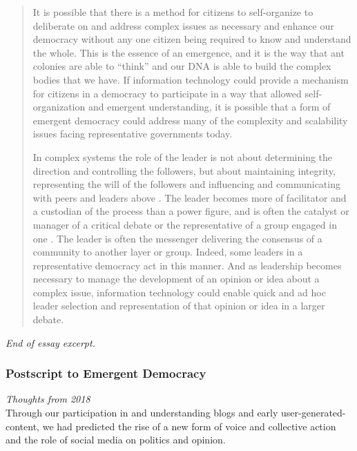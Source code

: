 \begin{quote}
It is possible that there is a method for citizens to self-organize to deliberate on and address complex issues as necessary and enhance our democracy without any one citizen being required to know and understand the whole. This is the essence of an emergence, and it is the way that ant colonies are able to ``think'' and our DNA is able to build the complex bodies that we have. If information technology could provide a mechanism for citizens in a democracy to participate in a way that allowed self-organization and emergent understanding, it is possible that a form of emergent democracy could address many of the complexity and scalability issues facing representative governments today.

In complex systems the role of the leader is not about determining the direction and controlling the followers, but about maintaining integrity, representing the will of the followers and influencing and communicating with peers and leaders above \cite{FuturePo61:online}. The leader becomes more of facilitator and a custodian of the process than a power figure, and is often the catalyst or manager of a critical debate or the representative of a group engaged in one \cite{Leadersh1:online}. The leader is often the messenger delivering the consensus of a community to another layer or group. Indeed, some leaders in a representative democracy act in this manner. And as leadership becomes necessary to manage the development of an opinion or idea about a complex issue, information technology could enable quick and ad hoc leader selection and representation of that opinion or idea in a larger debate. 
\end{quote}

\textit{End of essay excerpt.}


\subsubsection{Postscript to Emergent Democracy}

\textit{Thoughts from 2018} \\


Through our participation in and understanding blogs and early user-generated-content, we had predicted the rise of a new form of voice and collective action and the role of social media on politics and opinion.

